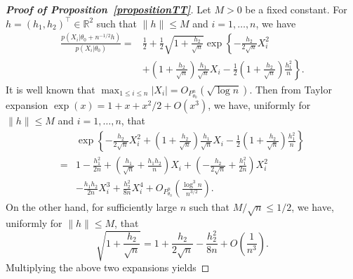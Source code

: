 \documentclass[11pt]{article}
\theoremstyle{plain}
\theoremstyle{definition}
\theoremstyle{remark}
\begin{document}
\begin{appendices}
\begin{proof}[\textbf{Proof of Proposition~\ref{propositionTT}}]
Let $M>0$ be a fixed constant.  For $h=(h_1,h_2)^\top \in \mathbb{R}^2$ such that $\|h\|\leq M$ and $i=1,\ldots, n$, we have
\begin{equation*}
    \begin{split}
    \frac{p(X_i|\theta_0+n^{-1/2}h)}{p(X_i|\theta_0)}
    =&
    \frac{1}{2}+\frac{1}{2}\sqrt{1+\frac{h_2}{\sqrt{n}}} \exp\left\{-\frac{h_2}{2\sqrt{n}}X_i^2
    \right.
        \\
        &\left.+\left(1+\frac{h_2}{\sqrt{n}}\right) \frac{h_1}{\sqrt{n}} X_i-\frac{1}{2}\left(1+\frac{h_2}{\sqrt{n}}\right)\frac{h_1^2}{n}\right\}.
    \end{split}
\end{equation*}
It is well known that $\max_{1\leq i\leq n}|X_i|=O_{P^n_{\theta_0}}(\sqrt{\log n})$.
Then from Taylor expansion $\exp(x)=1+x+x^2/2+O(x^3)$, we have, uniformly for $\|h\|\leq M$ and $i=1,\ldots,n$, that
\begin{align*}
    &\exp\left\{-\frac{h_2}{2\sqrt{n}}X_i^2+\left(1+\frac{h_2}{\sqrt{n}}\right) \frac{h_1}{\sqrt{n}} X_i-\frac{1}{2}\left(1+\frac{h_2}{\sqrt{n}}\right)\frac{h_1^2}{n}\right\}
    \\
    =&
1
-\frac{h_1^2}{2n}
+\left(\frac{h_1}{\sqrt{n}}+\frac{h_1 h_2}{n}\right)  X_i
+
    \left(
        -\frac{h_2}{2\sqrt{n}}
    +
     \frac{h_1^2}{2n}
\right)
    X_i^2
    \\
     &-\frac{h_1 h_2}{2n}X_i^3
    +\frac{h_2^2}{8n}X_i^4 
    +O_{P^n_{\theta_0}}\left(\frac{\log^3 n}{n^{3/2}}\right).
\end{align*}
On the other hand, for sufficiently large $n $ such that $M/\sqrt n \leq 1/2$, we have, uniformly for $\|h\|\leq M$, that
\begin{equation*}
    \sqrt{1+\frac{h_2}{\sqrt{n}}}=1+\frac{h_2}{2\sqrt{n}}-\frac{h_2^2}{8n} +O\left(\frac{1}{n^3}\right).
\end{equation*}
Multiplying the above two expansions yields

\end{proof}
\end{appendices}
\end{document}
